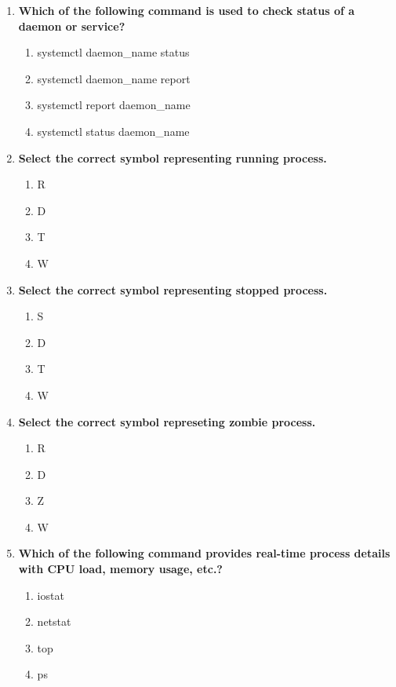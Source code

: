 \begin{flushleft}
\begin{enumerate}
		\item \textbf{Which of the following command is used to check status of a daemon or service?}
		\begin{enumerate}[label=(\alph*)]
			\item systemctl daemon\_name  status
			\item systemctl daemon\_name report
			\item systemctl report daemon\_name  
			\item systemctl status daemon\_name  %
		\end{enumerate}
		\bigskip
		\bigskip	


		\item \textbf{Select the correct symbol representing running process.}
		\begin{enumerate}[label=(\alph*)]
			\item R  %
			\item D
			\item T
			\item W
		\end{enumerate}
		\bigskip
		\bigskip	
		
		
		\item \textbf{Select the correct symbol representing stopped process.}
		\begin{enumerate}[label=(\alph*)]
			\item S  %
			\item D
			\item T
			\item W
		\end{enumerate}
		\bigskip
		\bigskip	


		\item \textbf{Select the correct symbol represeting zombie process.}
		\begin{enumerate}[label=(\alph*)]
			\item R  
			\item D
			\item Z  %
			\item W
		\end{enumerate}
		\bigskip
		\bigskip	


		\item \textbf{Which of the following command provides real-time process details with CPU load, memory usage, etc.?}
		\begin{enumerate}[label=(\alph*)]
			\item iostat
			\item netstat
			\item top    %
			\item ps
		\end{enumerate}
		\bigskip
		\bigskip	


\end{enumerate}
\end{flushleft}
